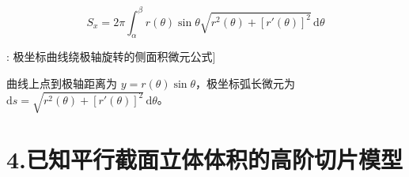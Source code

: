 \documentclass[11pt,a4paper,UTF8]{ctexart}
\begin{document}
\begin{equation*}
S_x = 2\pi \int_\alpha^\beta r(\theta)\sin\theta \sqrt{r^2(\theta) + [r'(\theta)]^2}\,\mathrm{d}\theta
\end{equation*}
\begin{thmbox}[模型[6]: 极坐标曲线绕极轴旋转的侧面积微元公式]

曲线上点到极轴距离为 $y = r(\theta)\sin\theta$，极坐标弧长微元为 $\mathrm{d}s = \sqrt{r^2(\theta) + [r'(\theta)]^2}\,\mathrm{d}\theta$。


\end{thmbox}

\section{4.已知平行截面立体体积的高阶切片模型}
\end{document}
